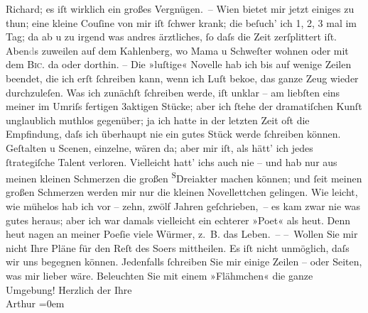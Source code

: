 \begin{ledgroupsized}[t]{13cm}
                        Richard; es iſt wirklich ein großes
                    Vergnügen. –\pend
           \pstart
           Wien bietet mir jetzt einiges zu thun; eine
                    kleine Couſine von mir iſt ſchwer krank;
                    die beſuch’ ich 1, 2, 3 mal im Tag; da{\geminationn} ab u zu
                    irgend was andres ärztliches, ſo daſs die Zeit zerſplittert iſt.
                        Aben\textcolor{gray}{d}s zuweilen auf dem Kahlenberg, wo Mama u Schweſter
                    wohnen oder mit dem \textsc{Bic.} da oder dorthin.\pend
           \pstart
           {\pb}– Die »luſtige« Novelle hab ich bis auf wenige Zeilen beendet, die ich erſt ſchreiben
                    kann, wenn ich Luſt beko{\geminationm}e, das ganze Zeug wieder
                    durchzuleſen. Was ich zunächſt ſchreiben werde, iſt unklar – am liebſten eins
                    meiner im Umriſs fertigen 3aktigen Stücke; aber ich ſtehe der dramatiſchen Kunſt
                    unglaublich muthlos gegenüber; ja ich hatte in der letzten Zeit oft die
                    Empfindung, daſs ich überhaupt nie {\pb}ein gutes
                    Stück werde ſchreiben können. Geſtalten u Scenen, einzelne, wären da; aber mir
                    iſt, als hätt’ ich jedes ſtrategiſche Talent verloren. Vielleicht hatt’ ichs
                    auch nie – und hab nur aus meinen kleinen Schmerzen die großen \substVorne{}\textsuperscript{S}\substDazwischen{}D\substHinten{}reiakter machen können; und ſeit meinen großen Schmerzen  werden mir nur die kleinen Novellettchen
                    gelingen. Wie leicht, wie mühelos hab ich vor – zehn, zwölf Jahren
                    geſchrieben, – {\pb}es kam zwar nie was gutes heraus;
                    aber ich war damals vielleicht ein echterer »Poet« als heut. Denn heut nagen an
                    meiner Poeſie viele Würmer, z. B. das Leben. –\pend
           \pstart
           – Wollen Sie mir nicht Ihre Pläne für den Reſt des So{\geminationm}ers mittheilen. Es iſt nicht unmöglich, daſs wir uns begegnen können.
                    Jedenfalls ſchreiben Sie mir einige Zeilen – oder Seiten, was mir lieber wäre.
                    Beleuchten {\pb}Sie mit einem »Flähmchen« die ganze
                    Umgebung!\pend
           \pstart
           Herzlich der Ihre{\\[\baselineskip]}\spacefill\mbox{Arthur}\pend
           \leftskip=0em{}
         

\end{ledgroupsized}
